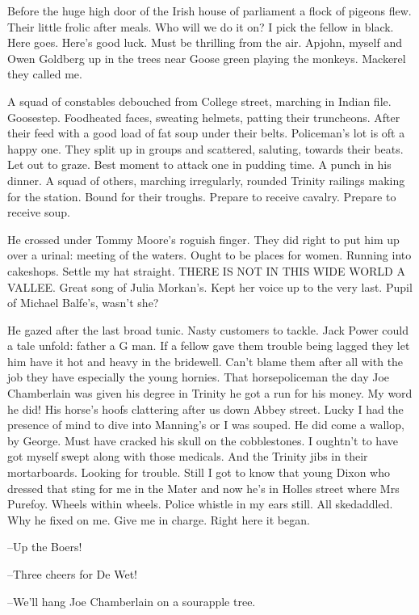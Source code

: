 Before the huge high door of the Irish house of parliament a flock of
pigeons flew. Their little frolic after meals. Who will we do it on? I
pick the fellow in black. Here goes. Here's good luck. Must be thrilling
from the air. Apjohn, myself and Owen Goldberg up in the trees near Goose
green playing the monkeys. Mackerel they called me.

A squad of constables debouched from College street, marching in
Indian file. Goosestep. Foodheated faces, sweating helmets, patting their
truncheons. After their feed with a good load of fat soup under their
belts. Policeman's lot is oft a happy one. They split up in groups and
scattered, saluting, towards their beats. Let out to graze. Best moment to
attack one in pudding time. A punch in his dinner. A squad of others,
marching irregularly, rounded Trinity railings making for the station.
Bound for their troughs. Prepare to receive cavalry. Prepare to receive
soup.

He crossed under Tommy Moore's roguish finger. They did right to
put him up over a urinal: meeting of the waters. Ought to be places for
women. Running into cakeshops. Settle my hat straight. THERE IS NOT IN
THIS WIDE WORLD A VALLEE. Great song of Julia Morkan's. Kept her voice up
to the very last. Pupil of Michael Balfe's, wasn't she?

He gazed after the last broad tunic. Nasty customers to tackle. Jack
Power could a tale unfold: father a G man. If a fellow gave them trouble
being lagged they let him have it hot and heavy in the bridewell. Can't
blame them after all with the job they have especially the young hornies.
That horsepoliceman the day Joe Chamberlain was given his degree in
Trinity he got a run for his money. My word he did! His horse's hoofs
clattering after us down Abbey street. Lucky I had the presence of mind to
dive into Manning's or I was souped. He did come a wallop, by George.
Must have cracked his skull on the cobblestones. I oughtn't to have got
myself swept along with those medicals. And the Trinity jibs in their
mortarboards. Looking for trouble. Still I got to know that young Dixon
who dressed that sting for me in the Mater and now he's in Holles street
where Mrs Purefoy. Wheels within wheels. Police whistle in my ears still.
All skedaddled. Why he fixed on me. Give me in charge. Right here it
began.

--Up the Boers!

--Three cheers for De Wet!

--We'll hang Joe Chamberlain on a sourapple tree.

